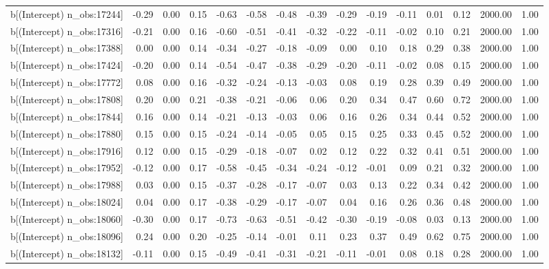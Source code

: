 \begin{table}[ht]
\begin{tabular}{rrrrrrrrrrrrrrr}
  b[(Intercept) n\_obs:17244] & -0.29 & 0.00 & 0.15 & -0.63 & -0.58 & -0.48 & -0.39 & -0.29 & -0.19 & -0.11 & 0.01 & 0.12 & 2000.00 & 1.00 \\ 
  b[(Intercept) n\_obs:17316] & -0.21 & 0.00 & 0.16 & -0.60 & -0.51 & -0.41 & -0.32 & -0.22 & -0.11 & -0.02 & 0.10 & 0.21 & 2000.00 & 1.00 \\ 
  b[(Intercept) n\_obs:17388] & 0.00 & 0.00 & 0.14 & -0.34 & -0.27 & -0.18 & -0.09 & 0.00 & 0.10 & 0.18 & 0.29 & 0.38 & 2000.00 & 1.00 \\ 
  b[(Intercept) n\_obs:17424] & -0.20 & 0.00 & 0.14 & -0.54 & -0.47 & -0.38 & -0.29 & -0.20 & -0.11 & -0.02 & 0.08 & 0.15 & 2000.00 & 1.00 \\ 
  b[(Intercept) n\_obs:17772] & 0.08 & 0.00 & 0.16 & -0.32 & -0.24 & -0.13 & -0.03 & 0.08 & 0.19 & 0.28 & 0.39 & 0.49 & 2000.00 & 1.00 \\ 
  b[(Intercept) n\_obs:17808] & 0.20 & 0.00 & 0.21 & -0.38 & -0.21 & -0.06 & 0.06 & 0.20 & 0.34 & 0.47 & 0.60 & 0.72 & 2000.00 & 1.00 \\ 
  b[(Intercept) n\_obs:17844] & 0.16 & 0.00 & 0.14 & -0.21 & -0.13 & -0.03 & 0.06 & 0.16 & 0.26 & 0.34 & 0.44 & 0.52 & 2000.00 & 1.00 \\ 
  b[(Intercept) n\_obs:17880] & 0.15 & 0.00 & 0.15 & -0.24 & -0.14 & -0.05 & 0.05 & 0.15 & 0.25 & 0.33 & 0.45 & 0.52 & 2000.00 & 1.00 \\ 
  b[(Intercept) n\_obs:17916] & 0.12 & 0.00 & 0.15 & -0.29 & -0.18 & -0.07 & 0.02 & 0.12 & 0.22 & 0.32 & 0.41 & 0.51 & 2000.00 & 1.00 \\ 
  b[(Intercept) n\_obs:17952] & -0.12 & 0.00 & 0.17 & -0.58 & -0.45 & -0.34 & -0.24 & -0.12 & -0.01 & 0.09 & 0.21 & 0.32 & 2000.00 & 1.00 \\ 
  b[(Intercept) n\_obs:17988] & 0.03 & 0.00 & 0.15 & -0.37 & -0.28 & -0.17 & -0.07 & 0.03 & 0.13 & 0.22 & 0.34 & 0.42 & 2000.00 & 1.00 \\ 
  b[(Intercept) n\_obs:18024] & 0.04 & 0.00 & 0.17 & -0.38 & -0.29 & -0.17 & -0.07 & 0.04 & 0.16 & 0.26 & 0.36 & 0.48 & 2000.00 & 1.00 \\ 
  b[(Intercept) n\_obs:18060] & -0.30 & 0.00 & 0.17 & -0.73 & -0.63 & -0.51 & -0.42 & -0.30 & -0.19 & -0.08 & 0.03 & 0.13 & 2000.00 & 1.00 \\ 
  b[(Intercept) n\_obs:18096] & 0.24 & 0.00 & 0.20 & -0.25 & -0.14 & -0.01 & 0.11 & 0.23 & 0.37 & 0.49 & 0.62 & 0.75 & 2000.00 & 1.00 \\ 
  b[(Intercept) n\_obs:18132] & -0.11 & 0.00 & 0.15 & -0.49 & -0.41 & -0.31 & -0.21 & -0.11 & -0.01 & 0.08 & 0.18 & 0.28 & 2000.00 & 1.00 \\ 

\end{tabular}
\end{table}
